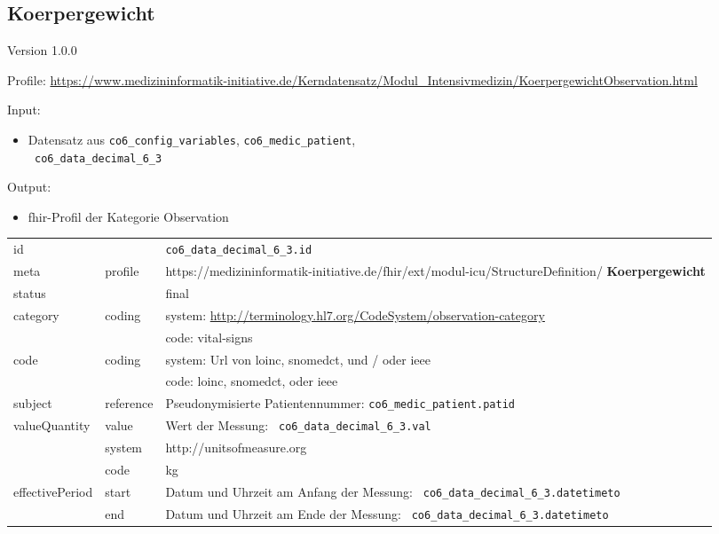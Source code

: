\subsection{
Koerpergewicht} 
\noindent Version 1.0.0

\noindent Profile: \url{https://www.medizininformatik-initiative.de/Kerndatensatz/Modul_Intensivmedizin/KoerpergewichtObservation.html}

\noindent Input:
\begin{itemize}
	\item Datensatz aus \texttt{co6\_config\_variables}, \texttt{co6\_medic\_patient}, \\ \texttt{
co6\_data\_decimal\_6\_3}
\end{itemize}
Output:
\begin{itemize}
        \item \ac{fhir}-Profil der Kategorie \glqq Observation\grqq{}
\end{itemize}
\begin{longtable}{|l|l|p{7.5cm}|}
        \hline
        \rowcolor{lightgray} \multicolumn{3}{|l|}{Data Mapping (inhaltlich)} \\ \hline
        id &  & \texttt{co6\_data\_decimal\_6\_3.id} \\ \hline
	meta & profile & https://medizininformatik-initiative.de/fhir/ext/modul-icu/StructureDefinition/\textbf{
Koerpergewicht} \\ \hline 
	status &  & final  \\ \hline 
	category & coding & system: \url{http://terminology.hl7.org/CodeSystem/observation-category} \\
\cline{3-3}
	& & code: vital-signs \\ \hline
	code & coding & system: Url von \ac{loinc}, \ac{snomedct}, und / oder \ac{ieee} \\ 
	\cline{3-3} 
	 &  & code: \ac{loinc}, \ac{snomedct}, oder \ac{ieee} \\ \hline
	subject & reference & Pseudonymisierte Patientennummer: \texttt{co6\_medic\_patient.patid} \\ \hline
	valueQuantity & value & Wert der Messung: \texttt{
co6\_data\_decimal\_6\_3.val} \\
        \cline{2-3}
         & system & http://unitsofmeasure.org \\
         \cline{2-3}
         & code & kg \\ \hline
    effectivePeriod & start & Datum und Uhrzeit am Anfang der Messung: \texttt{
co6\_data\_decimal\_6\_3.datetimeto} \\
    \cline{2-3}
     & end & Datum und Uhrzeit am Ende der Messung: \texttt{
co6\_data\_decimal\_6\_3.datetimeto} \\ \hline
\end{longtable}


